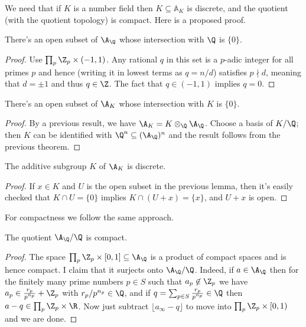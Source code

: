 We need that if $K$ is a number field then
$K\subseteq\mathbb{A}_K$ is discrete, and the quotient (with the
quotient topology) is compact. Here is a proposed proof.

\begin{theorem}
  \label{Rat.AdeleRing.zero_discrete}
  \leanok
  There's an open subset of $\A_{\Q}$ whose intersection with $\Q$ is $\{0\}$.
\end{theorem}
\begin{proof}
  Use $\prod_p{\Z_p}\times(-1,1)$. Any rational $q$ in this set is a $p$-adic
  integer for all primes $p$ and hence (writing it in lowest terms as $q=n/d$)
  satisfies $p\nmid d$, meaning that $d=\pm1$ and thus $q\in\Z$. The fact
  that $q\in(-1,1)$ implies $q=0$.
\end{proof}

\begin{theorem}
  \label{NumberField.AdeleRing.zero_discrete}
  \leanok
  There's an open subset of $\A_{K}$ whose intersection with $K$ is $\{0\}$.
\end{theorem}
\begin{proof}
  By a previous result, we have $\A_K=K\otimes_{\Q}\A_{\Q}$.
  Choose a basis of $K/\Q$; then $K$ can be identified with $\Q^n\subseteq(\A_{\Q})^n$
  and the result follows from the previous theorem.
\end{proof}

\begin{theorem}
  \label{NumberField.AdeleRing.discrete}
  \leanok
  The additive subgroup $K$ of $\A_K$ is discrete.
\end{theorem}
\begin{proof}
  If $x\in K$ and $U$ is the open subset in the previous lemma, then
  it's easily checked that $K\cap U=\{0\}$ implies $K\cap (U+x)=\{x\}$,
  and $U+x$ is open.
\end{proof}

For compactness we follow the same approach.

\begin{theorem}
  \label{Rat.AdeleRing.cocompact}
  \leanok
  The quotient $\A_{\Q}/\Q$ is compact.
\end{theorem}
\begin{proof}
  The space $\prod_p\Z_p\times[0,1]\subseteq\A_{\Q}$ is a product of compact spaces
  and is hence compact. I claim that it surjects onto $\A_{\Q}/\Q$. Indeed,
  if $a\in\A_{\Q}$ then for the finitely many prime numbers $p\in S$ such that $a_p\not\in\Z_p$
  we have $a_p\in\frac{r_p}{p^{n_p}}+\Z_p$ with $r_p/p^{n_p}\in\Q$, and
  if $q=\sum_{p\in S}\frac{r_p}{p^{n_p}}\in\Q$ then $a-q\in \prod_p\Z_p\times\R$.
  Now just subtract $\lfloor a_{\infty}-q\rfloor$ to move into $\prod_p\Z_p\times[0,1)$
  and we are done.
\end{proof}

